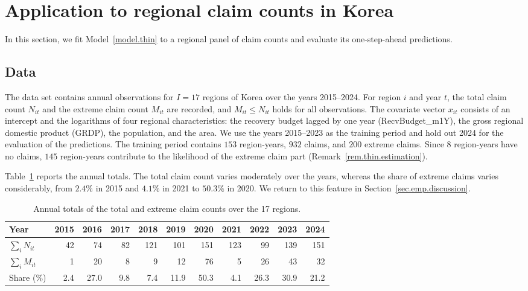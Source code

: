 \section{Application to regional claim counts in Korea}
\label{sec.empirical}

In this section, we fit Model~\ref{model.thin} to a regional panel of
claim counts and evaluate its one-step-ahead predictions.

\subsection{Data}
\label{sec.emp.data}

The data set contains annual observations for \(I=17\) regions of
Korea over the years 2015--2024. For region \(i\) and year \(t\), the
total claim count \(N_{it}\) and the extreme claim count \(M_{it}\) are
recorded, and \(M_{it}\le N_{it}\) holds for all observations.
The covariate vector \(x_{it}\) consists of an intercept and the
logarithms of four regional characteristics: the recovery budget lagged
by one year (RecvBudget\_m1Y), the gross regional domestic product
(GRDP), the population, and the area.
We use the years 2015--2023 as the training period and hold out 2024
for the evaluation of the predictions. The training period contains
\(153\) region-years, \(932\) claims, and \(200\) extreme claims. Since
\(8\) region-years have no claims, \(145\) region-years contribute to the
likelihood of the extreme claim part (Remark~\ref{rem.thin.estimation}).

Table~\ref{tab.emp.year} reports the annual totals. The total claim
count varies moderately over the years, whereas the share of extreme
claims varies considerably, from \(2.4\%\) in 2015 and \(4.1\%\) in 2021
to \(50.3\%\) in 2020. We return to this feature in
Section~\ref{sec.emp.discussion}.

\begin{table}[htbp]
\centering
\caption{Annual totals of the total and extreme claim counts over the
17 regions.}
\label{tab.emp.year}
\small
\begin{tabular}{lrrrrrrrrrr}
\toprule
Year & 2015 & 2016 & 2017 & 2018 & 2019 & 2020 & 2021 & 2022 & 2023 & 2024\\
\midrule
\(\sum_i N_{it}\) & 42 & 74 & 82 & 121 & 101 & 151 & 123 & 99 & 139 & 151\\
\(\sum_i M_{it}\) & 1 & 20 & 8 & 9 & 12 & 76 & 5 & 26 & 43 & 32\\
Share (\%) & 2.4 & 27.0 & 9.8 & 7.4 & 11.9 & 50.3 & 4.1 & 26.3 & 30.9 & 21.2\\
\bottomrule
\end{tabular}
\end{table}

